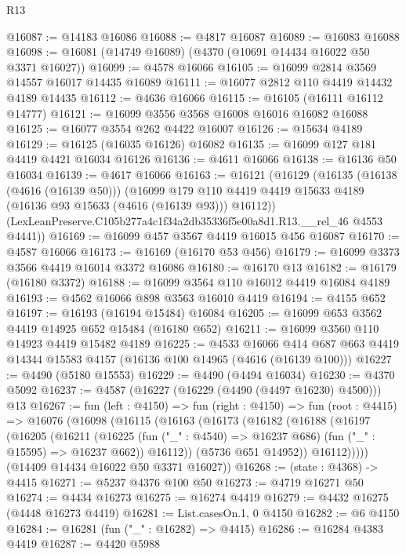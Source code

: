 \begin{lexlean}{R13}
\begin{coremodule}
@16087 := @14183 @16086
@16088 := @4817 @16087
@16089 := @16083 @16088
@16098 := @16081 (@14749 @16089) (@4370 (@10691 @14434 @16022 @50 @3371 @16027))
@16099 := @4578 @16066
@16105 := @16099 @2814 @3569 @14557 @16017 @14435 @16089
@16111 := @16077 @2812 @110 @4419 @14432 @4189 @14435
@16112 := @4636 @16066
@16115 := @16105 (@16111 @16112 @14777)
@16121 := @16099 @3556 @3568 @16008 @16016 @16082 @16088
@16125 := @16077 @3554 @262 @4422 @16007
@16126 := @15634 @4189
@16129 := @16125 (@16035 @16126) @16082
@16135 := @16099 @127 @181 @4419 @4421 @16034 @16126
@16136 := @4611 @16066
@16138 := @16136 @50 @16034
@16139 := @4617 @16066
@16163 := @16121
    (@16129
      (@16135
        (@16138 (@4616 (@16139 @50)))
        (@16099 @179 @110 @4419 @4419 @15633 @4189 (@16136 @93 @15633 (@4616 (@16139 @93))) @16112))
      (LexLeanPreserve.C105b277a4c1f34a2db35336f5e00a8d1.R13.__rel_46 @4553 @4441))
@16169 := @16099 @457 @3567 @4419 @16015 @456 @16087
@16170 := @4587 @16066
@16173 := @16169 (@16170 @53 @456)
@16179 := @16099 @3373 @3566 @4419 @16014 @3372 @16086
@16180 := @16170 @13
@16182 := @16179 (@16180 @3372)
@16188 := @16099 @3564 @110 @16012 @4419 @16084 @4189
@16193 := @4562 @16066 @898 @3563 @16010 @4419
@16194 := @4155 @652
@16197 := @16193 (@16194 @15484) @16084
@16205 := @16099 @653 @3562 @4419 @14925 @652 @15484 (@16180 @652)
@16211 := @16099 @3560 @110 @14923 @4419 @15482 @4189
@16225 := @4533
    @16066
    @414
    @687
    @663
    @4419
    @14344
    @15583
    @4157
    (@16136 @100 @14965 (@4616 (@16139 @100)))
@16227 := @4490 (@5180 @15553)
@16229 := @4490 (@4494 @16034)
@16230 := @4370 @5092
@16237 := @4587 (@16227 (@16229 (@4490 (@4497 @16230) @4500))) @13
@16267 := fun (left : @4150) =>
  fun (right : @4150) =>
  fun (root : @4415) =>
  @16076
    (@16098
      (@16115
        (@16163
          (@16173
            (@16182
              (@16188
                (@16197
                  (@16205
                    (@16211
                      (@16225
                        (fun ("_" : @4540) => @16237 @686)
                        (fun ("_" : @15595) => @16237 @662))
                      @16112))
                  (@5736 @651 @14952))
                @16112)))))
      (@14409 @14434 @16022 @50 @3371 @16027))
@16268 := (state : @4368) -> @4415
@16271 := @5237 @4376 @100 @50
@16273 := @4719 @16271 @50
@16274 := @4434 @16273
@16275 := @16274 @4419
@16279 := @4432 @16275 (@4448 @16273 @4419)
@16281 := List.casesOn.{1, 0} @4150
@16282 := @6 @4150
@16284 := @16281 (fun ("_" : @16282) => @4415)
@16286 := @16284 @4383 @4419
@16287 := @4420 @5988

\end{coremodule}
\end{lexlean}
